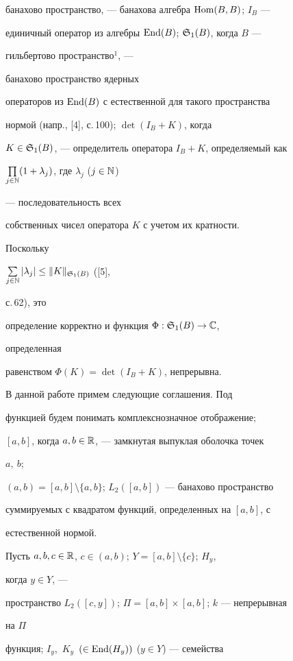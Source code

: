 банахово пространство, --- банахова алгебра $\operatorname{Hom}(B,B)$; $I_B$ --- 


единичный оператор из алгебры $\operatorname{End}(B)$; $\frak S_1(B)$, когда $B$ --- 


гильбертово пространство${}^1$, --- 


банахово пространство ядерных 


операторов из $\operatorname{End}(B)$ с естественной для такого пространства 


нормой (напр., [4], с.\,100); $\det(I_B+K)$, когда 


$K\in\frak S_1(B)$, --- определитель оператора $I_B+K$, определяемый как 


$\prod\limits_{j\in\Bbb N}(1+\lambda_j)$, где $\lambda_j$ ($j\in\Bbb N$) 


--- последовательность всех 


собственных чисел оператора $K$ с учетом их кратности. 


Поскольку 


$\sum\limits_{j\in \Bbb N}|\lambda_j|\le\|K\|_{\frak S_1(B)}$ ([5], 


с.\,62), это 


определение корректно и функция $\Phi:\frak S_1(B)\to\Bbb C$, 


определенная 


равенством $\Phi(K)=\det(I_B+K)$, непрерывна. 


 


В данной работе примем следующие соглашения. Под 


функцией будем понимать комплекснозначное отображение;


$[a,b]$, когда $a,b\in\Bbb R$, --- замкнутая выпуклая оболочка точек 


$a,\ b$; 


$(a,b)=[a,b]\setminus\{a,b\}$; $L_2([a,b])$ --- банахово пространство 


суммируемых с квадратом функций, определенных на $[a,b]$, с 


естественной нормой. 


 


Пусть $a,b,c\in\Bbb R$, $c\in(a,b)$; $Y=[a,b]\setminus\{c\}$; $H_y$, 


когда $y\in Y$, --- 


пространство $L_2([c,y])$; $\Pi=[a,b]\times[a,b]$; $k$ --- непрерывная 


на $\Pi$ 


функция; $I_y$,~$K_y$~$(\in\operatorname{End}(H_y))$ ($y\in Y$) --- семейства 


